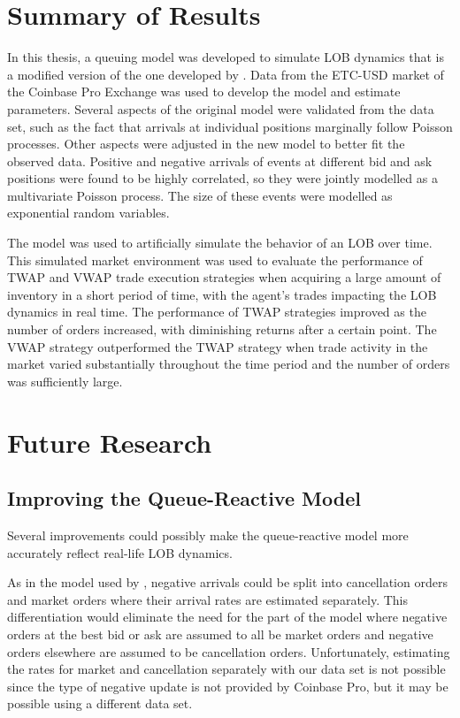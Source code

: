 \section{Summary of Results}
In this thesis, a queuing model was developed to simulate LOB dynamics that is a modified version of the one developed by \cite{A6}. Data from the ETC-USD market of the Coinbase Pro Exchange was used to develop the model and estimate parameters. Several aspects of the original model were validated from the data set, such as the fact that arrivals at individual positions marginally follow Poisson processes. Other aspects were adjusted in the new model to better fit the observed data. Positive and negative arrivals of events at different bid and ask positions were found to be highly correlated, so they were jointly modelled as a multivariate Poisson process. The size of these events were modelled as exponential random variables. 

The model was used to artificially simulate the behavior of an LOB over time. This simulated market environment was used to evaluate the performance of TWAP and VWAP trade execution strategies when acquiring a large amount of inventory in a short period of time, with the agent's trades impacting the LOB dynamics in real time. The performance of TWAP strategies improved as the number of orders increased, with diminishing returns after a certain point. The VWAP strategy outperformed the TWAP strategy when trade activity in the market varied substantially throughout the time period and the number of orders was sufficiently large.

\section{Future Research}
\subsection{Improving the Queue-Reactive Model}
Several improvements could possibly make the queue-reactive model more accurately reflect real-life LOB dynamics. 

As in the model used by \cite{A6}, negative arrivals could be split into cancellation orders and market orders where their arrival rates are estimated separately. This differentiation would eliminate the need for the part of the model where negative orders at the best bid or ask are assumed to all be market orders and negative orders elsewhere are assumed to be cancellation orders. Unfortunately, estimating the rates for market and cancellation separately with our data set is not possible since the type of negative update is not provided by Coinbase Pro, but it may be possible using a different data set.

